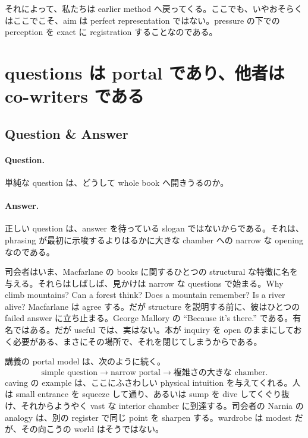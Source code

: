 それによって、私たちは earlier method へ戻ってくる。ここでも、いやおそらくはここでこそ、aim は perfect representation ではない。pressure の下での perception を exact に registration することなのである。

\section{questions は portal であり、他者は co-writers である}

\subsection{Question \& Answer}

\paragraph{Question.} 単純な question は、どうして whole book へ開きうるのか。

\paragraph{Answer.} 正しい question は、answer を待っている slogan ではないからである。それは、phrasing が最初に示唆するよりはるかに大きな chamber への narrow な opening なのである。

司会者はいま、Macfarlane の books に関するひとつの structural な特徴に名を与える。それらはしばしば、見かけは narrow な questions で始まる。Why climb mountains? Can a forest think? Does a mountain remember? Is a river alive? Macfarlane は agree する。だが structure を説明する前に、彼はひとつの failed answer に立ち止まる。George Mallory の ``Because it's there.'' である。有名ではある。だが useful では、実はない。本が inquiry を open のままにしておく必要がある、まさにその場所で、それを閉じてしまうからである。

講義の portal model は、次のように続く。
\begin{equation}
\text{simple question} \longrightarrow \text{narrow portal} \longrightarrow \text{複雑さの大きな chamber}.
\end{equation}
caving の example は、ここにふさわしい physical intuition を与えてくれる。人は small entrance を squeeze して通り、あるいは sump を dive してくぐり抜け、それからようやく vast な interior chamber に到達する。司会者の Narnia の analogy は、別の register で同じ point を sharpen する。wardrobe は modest だが、その向こうの world はそうではない。

